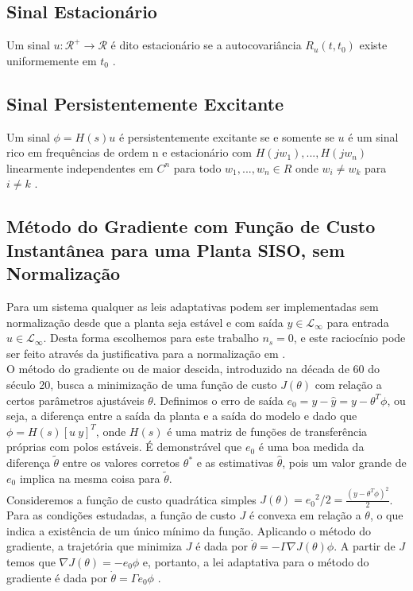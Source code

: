 \documentclass[
	12pt,				%
	openright,			%
	twoside,			%
	a4paper,			%
	english,			%
	french,				%
	spanish,			%
	brazil				%
	]{abntex2}
\begin{document}
\subsection{Sinal Estacionário} 
 
 Um sinal $u:\mathcal{R}^+\rightarrow \mathcal{R}$ é dito estacionário se a autocovariância $R_u(t,t_0)$ existe uniformemente em $t_0$ \cite[p.~256]{ioannou2}.

\subsection{Sinal Persistentemente Excitante}

 Um sinal $\phi = H(s)u $ é persistentemente excitante se e somente se $u$ é um sinal rico em frequências de ordem n e estacionário com $H(jw_1),...,H(jw_n)$ linearmente independentes em $C^n$ para todo $w_1,...,w_n \in R$ onde $w_i\neq w_k$ para $i\neq k$ \cite[p.~256-257]{ioannou2}. \\

\subsection{Método do Gradiente com Função de Custo Instantânea para uma Planta SISO, sem Normalização}
  
  
  Para um sistema qualquer as leis adaptativas podem ser implementadas sem normalização desde
  que a planta seja estável e com saída $y\in \mathcal{L}_\infty$ para entrada $u\in \mathcal{L}_\infty$. Desta forma escolhemos para este trabalho $n_s=0$, e este raciocínio pode ser feito através da justificativa para a normalização em \cite[p.~162]{ioannou2}.\\
  
 O método do gradiente ou de maior descida, introduzido na década de 60 do século 20, busca a minimização de uma função de custo $J(\theta)$ com relação a certos parâmetros ajustáveis $\theta$. Definimos o erro de saída $e_0 = y - \hat{y} = y-\theta^T\phi$, ou seja, a diferença entre a saída da planta e a saída do modelo e dado que $\phi = H(s)[u~y]^T$, onde $H(s)$ é uma matriz de funções de transferência próprias com polos estáveis. É demonstrável que $e_0$ é uma boa medida da diferença $\tilde{\theta}$ entre os valores corretos $\theta^*$ e as estimativas $\hat{\theta}$, pois um valor grande de $e_0$ implica na mesma coisa para $\tilde{\theta}$.\\
 
 Consideremos a função de custo quadrática simples $J(\theta) = {e_0}^2/2 = \frac{(y - \theta^T \phi)^2}{2}$. Para as condições estudadas, a função de custo $J$ é convexa em relação a $\theta$, o que indica a existência de um único mínimo da função. Aplicando o método do gradiente, a trajetória que minimiza $J$ é dada por $\dot{\theta} = -\Gamma \nabla J(\theta) \phi$. A partir de $J$ temos que $ \nabla J(\theta) = -e_0 \phi$ e, portanto, a lei adaptativa para o método do gradiente é dada por $\dot{\theta} = \Gamma e_0 \phi$ \cite[p.~180-186]{ioannou2}.
\end{document}
